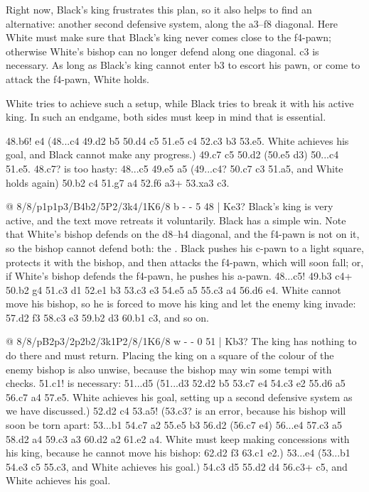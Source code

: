 Right now, Black's king frustrates this plan, so it also helps to find an alternative: another
second defensive system, along the a3--f8 diagonal.
Here White must make sure that Black's king never comes close to the f4-pawn; otherwise White's
bishop can no longer defend along one diagonal. \K c3 is
necessary. As long as Black's king cannot enter b3 to escort his pawn, or come to attack the f4-pawn,
White holds.

White tries to achieve such a setup, while Black tries to break it with his active
king. In such an endgame, both sides must keep in mind
that  is essential.

48.\B b6! \K e4 (48...\K c4 49.\K d2 \K b5 50.\B d4 c5 51.\B e5 \K c4 52.\B c3 \K b3 53.\B e5. White achieves his goal, and Black cannot make any progress.) 49.\B c7 c5 50.\K d2 (50.\B e5 \K d3) 50...c4 51.\B e5. 48.\B c7? is too hasty: 48...c5 49.\B e5 a5 (49...c4? 50.\B c7 c3 51.\B a5, and White holds again) 50.\K b2 c4 51.\B g7 a4 52.\B f6 a3+ 53.\K xa3 c3.

@ 8/8/p1p1p3/B4b2/5P2/3k4/1K6/8 b - - 5 48 | Ke3?
Black's king is very active, and the text move retreats it voluntarily. Black has a simple win. Note
that White's bishop defends on the d8--h4 diagonal, and the f4-pawn is not on it, so the bishop
cannot defend both: the . Black
pushes his c-pawn to a light square, protects it with the bishop, and then attacks the f4-pawn, which
will soon fall; or, if White's bishop defends the f4-pawn, he pushes his a-pawn. 48...c5!
49.\K b3 c4+ 50.\K b2 \B g4 51.\B c3 \B d1 52.\B e1 \B b3 53.\B c3 \K e3 54.\B e5 a5 55.\K c3 a4
56.\B d6 \K e4. White cannot move his bishop, so he is forced to move his king and let the enemy king
invade: 57.\K d2 \K f3 58.\K c3 \K e3 59.\K b2 \K d3 60.\K b1 c3, and so on.

@ 8/8/pB2p3/2p2b2/3k1P2/8/1K6/8 w - - 0 51 | Kb3?
The king has nothing to do there and must return. Placing the king on a square of the colour of
the enemy bishop is also unwise, because the bishop may win some tempi with checks. 51.\K c1! is
necessary: 51...\K d5 (51...\B d3 52.\K d2 \B b5 53.\B c7 \K e4 54.\K c3 \B e2 55.\B d6 a5 56.\B c7
a4 57.\B e5. White achieves his goal, setting up a second defensive system as we have discussed.)
52.\K d2 c4 53.\B a5! (53.\K c3? is an error, because his bishop will soon be torn apart: 53...\B b1
54.\B c7 \B a2 55.\B e5 \B b3 56.\K d2 (56.\B c7 \K e4) 56...\K e4 57.\K c3 a5 58.\K d2 a4 59.\K c3
a3 60.\K d2 a2 61.\K e2 \B a4. White must keep making concessions with his king, because he cannot
move his bishop: 62.\K d2 \K f3 63.\K c1 \K e2.) 53...\K e4 (53...\B b1 54.\K e3 \K c5 55.\B c3,
and White achieves his goal.) 54.\K c3 \K d5 55.\K d2 \K d4 56.\B c3+ \K c5, and White achieves his
goal.

